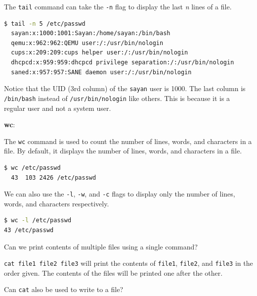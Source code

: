 The \texttt{tail} command can take the \texttt{-n} flag to display the last \textit{n} lines of a file.

\begin{lstlisting}[language=bash]
  $ tail -n 5 /etc/passwd
  sayan:x:1000:1001:Sayan:/home/sayan:/bin/bash
  qemu:x:962:962:QEMU user:/:/usr/bin/nologin
  cups:x:209:209:cups helper user:/:/usr/bin/nologin
  dhcpcd:x:959:959:dhcpcd privilege separation:/:/usr/bin/nologin
  saned:x:957:957:SANE daemon user:/:/usr/bin/nologin
\end{lstlisting}

\begin{exercise}
  Notice that the UID (3rd column) of the \texttt{sayan} user is 1000.
  The last column is \texttt{/bin/bash} instead of \texttt{/usr/bin/nologin} like others.
  This is because it is a regular user and not a system user.
\end{exercise}

\textbf{wc}:

The \texttt{wc} command is used to count the number of lines, words, and characters in a file.
By default, it displays the number of lines, words, and characters in a file.

\begin{lstlisting}[language=bash]
$ wc /etc/passwd
  43  103 2426 /etc/passwd
\end{lstlisting}

We can also use the \texttt{-l}, \texttt{-w}, and \texttt{-c} flags to display only the number of lines, words, and characters respectively.

\begin{lstlisting}[language=bash]
$ wc -l /etc/passwd
43 /etc/passwd
\end{lstlisting}


\begin{qs}
  Can we print contents of multiple files using a single command?
\end{qs}

\begin{ans}
  \texttt{cat file1 file2 file3} will print the contents of \texttt{file1}, \texttt{file2}, and \texttt{file3}
  in the order given. The contents of the files will be printed one after the other.
\end{ans}

\begin{qs}
  Can \texttt{cat} also be used to write to a file?
\end{qs}

